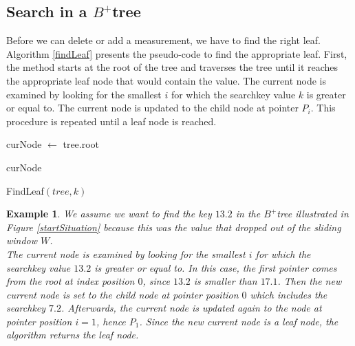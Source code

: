 \documentclass[abstracton,12pt,oneside]{scrreprt}
\newtheorem{example}{Example}
\begin{document}
\subsection{Search in a $B^+$tree}
Before we can delete or add a measurement, we have to find the right leaf. 
Algorithm \ref{findLeaf} presents the pseudo-code to find the appropriate leaf. First, the method starts at the root of the tree and traverses the tree until it reaches the appropriate leaf node that would contain the value. The current node is examined by looking for the smallest $i$ for which the searchkey value $k$ is greater or equal to. The current node is updated to the child node at pointer $P_i$. This procedure is repeated until a leaf node is reached. 
\BlankLine


\begin{algorithm}[H]
	\IncMargin{1em}
	\SetAlgoLined
	\DontPrintSemicolon

		curNode $\leftarrow$ tree.root\; 
		
	
	\Return curNode\;


	\caption{FindLeaf$(tree, k)$}	\label{findLeaf}
\end{algorithm}

\begin{example}
	We assume we want to find the key $13.2$ in the $B^+$tree illustrated in Figure \ref{startSituation} because this was the value that dropped out of the sliding window $W$. \\
	The current node is examined by looking for the smallest $i$ for which the searchkey value $13.2$ is greater or equal to.  In this case, the first pointer comes from the root at index position $0$, since $13.2$ is smaller than $17.1$. Then the new current node is set to the child node at pointer position $0$ which includes the searchkey $7.2$. Afterwards, the current node is updated again to the node at pointer position $i=1$, hence $P_1$. Since the new current node is a leaf node, the algorithm returns the leaf node. 
\end{example} 
\end{document}
